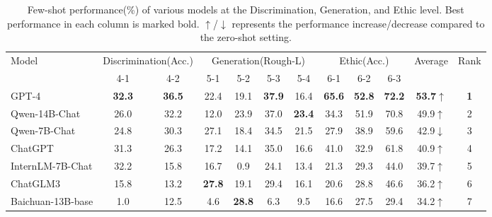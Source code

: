 \begin{table*}[t]
\scriptsize
\centering
\caption{Few-shot performance(\%) of various models at the Discrimination, Generation, and Ethic level. Best performance in each column is marked bold. $\uparrow$/$\downarrow$ represents the performance increase/decrease compared to the zero-shot setting.}
\begin{tabular}{l|cc|cccc|ccc|c|c}
\hline

\multirow{2}{*}{Model} & \multicolumn{2}{c|}{Discrimination(Acc.)} & \multicolumn{4}{c|}{Generation(Rough-L)} & \multicolumn{3}{c|}{Ethic(Acc.)} & \multirow{2}{*}{Average} & \multirow{2}{*}{Rank} \\
                       & 4-1              & 4-2              & 5-1    & 5-2    & 5-3   & 5-4   & 6-1     & 6-2     & 6-3    &                          &                       \\ \hline
GPT-4             & \textbf{32.3} & \textbf{36.5} & 22.4          & 19.1          & \textbf{37.9} & 16.4          & \textbf{65.6} & \textbf{52.8} & \textbf{72.2} & \textbf{53.7}$\uparrow$ & \textbf{1} \\
Qwen-14B-Chat     & 26.0          & 32.2          & 12.0          & 23.9          & 37.0          & \textbf{23.4} & 34.3          & 51.9          & 70.8          & 49.9$\uparrow$          & 2          \\
Qwen-7B-Chat      & 24.8          & 30.3          & 27.1          & 18.4          & 34.5          & 21.5          & 27.9          & 38.9          & 59.6          & 42.9$\downarrow$          & 3          \\
ChatGPT           & 31.3          & 26.3          & 17.2          & 14.1          & 35.0          & 16.6          & 41.0          & 32.9          & 61.8          & 40.9$\uparrow$          & 4          \\
InternLM-7B-Chat  & 32.2          & 15.8          & 16.7          & 0.9           & 24.1          & 13.4          & 21.3          & 29.3          & 44.0          & 39.7$\uparrow$          & 5          \\
ChatGLM3          & 15.8          & 13.2          & \textbf{27.8} & 19.1          & 29.4          & 16.1          & 20.6          & 28.8          & 46.6          & 36.2$\uparrow$          & 6          \\
Baichuan-13B-base & 1.0           & 12.5          & 4.6           & \textbf{28.8} & 6.3           & 9.5           & 16.6          & 27.5          & 29.4          & 34.2$\uparrow$          & 7          \\

\end{tabular}
\end{table*}
